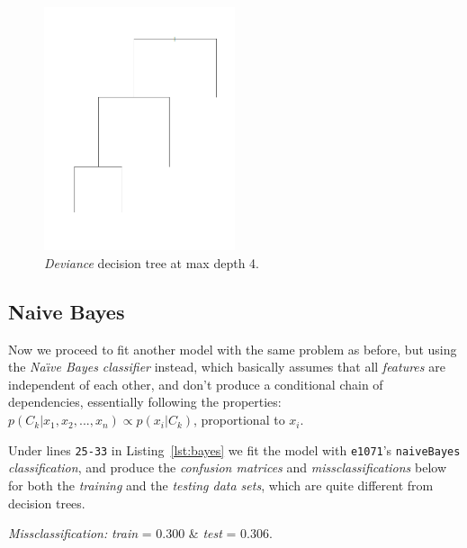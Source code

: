 \documentclass[a4paper, twocolumn]{article}
\begin{document}
    \begin{figure}[h!]
		\includegraphics[width=0.5\textwidth]{share/best_subtree.png}  
		\caption{\textit{Deviance} decision tree at max depth 4.\label{fig:best_subtree}}
	\end{figure}

	\subsection{Naive Bayes}

        Now we proceed to fit another model with the same problem as before, but using the \emph{Na{\"\i}ve Bayes classifier} instead, which basically assumes that all \emph{features} are independent of each other, and don't produce a conditional chain of dependencies, essentially following the properties: $p(C_k | x_1, x_2, ..., x_n) \propto p(x_i | C_k)$, proportional to $x_i$.

        Under lines \texttt{25-33} in Listing~\ref{lst:bayes} we fit the model with \texttt{e1071}'s \texttt{naiveBayes} \emph{classification}, and produce the \emph{confusion matrices} and \emph{missclassifications} below for both the \emph{training} and the \emph{testing data sets}, which are quite different from decision trees.

        \emph{Missclassification:} \emph{train} = 0.300 \& \emph{test} = 0.306.
\end{document}
